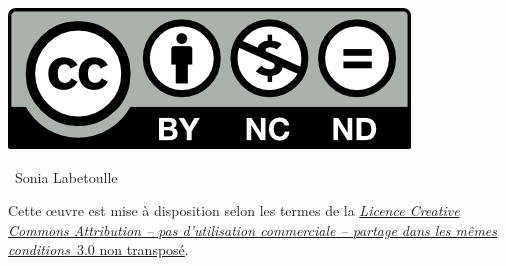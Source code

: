 \noindent\includegraphics{by-nc-nd}

\noindent\textcopyright~Sonia Labetoulle

\noindent Cette {\oe}uvre est mise à disposition selon les termes 
de la \href{http://creativecommons.org/licenses/by-nc-sa/3.0/}
{\emph{Licence Creative Commons Attribution -- pas d'utilisation 
commerciale -- partage dans les mêmes conditions}~3.0 non transposé}.
